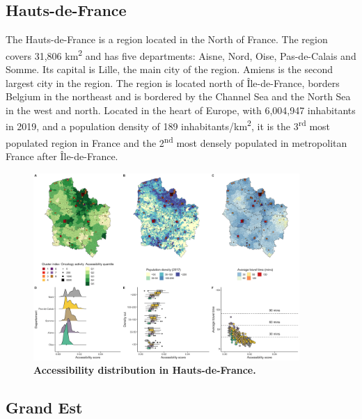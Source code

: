 \subsection*{Hauts-de-France}

The Hauts-de-France is a region located in the North of France. The region covers 31,806 km\textsuperscript{2} and has five departments: Aisne, Nord, Oise, Pas-de-Calais and Somme. Its capital is Lille, the main city of the region. Amiens is the second largest city in the region. The region is located north of Île-de-France, borders Belgium in the northeast and is bordered by the Channel Sea and the North Sea in the west and north. Located in the heart of Europe, with 6,004,947 inhabitants in 2019, and a population density of 189 inhabitants/km\textsuperscript{2}, it is the 3\textsuperscript{rd} most populated region in France and the 2\textsuperscript{nd} most densely populated in metropolitan France after Île-de-France.

\begin{figure}[H]
    \includegraphics[width=0.9\textwidth]{images/camion/region_accessibility/accessibility_Hauts-de-France.png}
    \centering
    \caption{
        \textbf{Accessibility distribution in Hauts-de-France.}
    }
\end{figure}

\subsection*{Grand Est}

